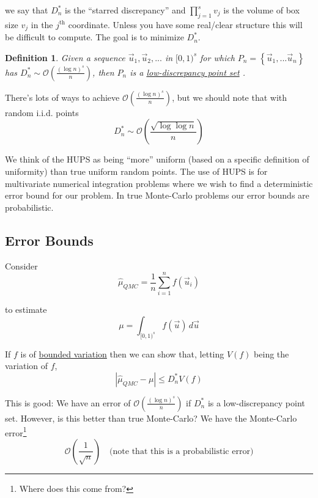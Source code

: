 \documentclass[12pt]{article}
\newtheorem{definition}{Definition}
\newlength\tindent
\renewcommand{\indent}{\hspace*{\tindent}}
\begin{document}
we say that $D_n^*$ is the ``starred discrepancy'' and $\prod^s_{j = 1} v_j$ is the volume of box size $v_j$ in the $j^{\text{th}}$ coordinate. Unless you have some real/clear structure this will be difficult to compute. The goal is to minimize $D_n^*$.

\begin{definition} Given a sequence $\vec{u}_1, \vec{u}_2, ...$ in $[0, 1)^s$ for which $P_n = \left\{ \vec{u}_1, ... \vec{u}_n \right\}$ has $D^*_n \sim \mathcal O \left( \frac{ (\log n)^s }{n} \right)$, then $P_n$ is a \underline{low-discrepancy point set} .
\end{definition}

There's lots of ways to achieve $ \mathcal O \left( \frac{ (\log n)^s }{n} \right)$, but we should note that with random i.i.d. points
\begin{equation*}
	D^*_n \sim \mathcal O \left( \frac{ \sqrt{ \log \log n } }{ n } \right)
\end{equation*}

\indent We think of the HUPS as being ``more'' uniform (based on a specific definition of uniformity) than true uniform random points. The use of HUPS is for multivariate numerical integration problems where we wish to find a deterministic error bound for our problem. In true Monte-Carlo problems our error bounds are probabilistic.

\subsection{Error Bounds}

Consider
\begin{equation*}
	\hat{\mu}_{QMC} = \frac{1}{n} \sum^n_{i = 1} f(\vec{u}_i)
\end{equation*}

to estimate
\begin{equation*}
	\mu = \int_{[0, 1)^s} f(\vec{u}) \,d\vec{u}
\end{equation*}

If $f$ is of \underline{bounded variation} then we can show that, letting $V(f)$ being the variation of $f$,
\begin{equation*}
	\left| \hat{\mu}_{QMC} - \mu \right| \leq D^*_n V(f)
\end{equation*}

\indent This is good: We have an error of $\mathcal O \left( \frac{ (\log n)^s }{n} \right)$ if $D^*_n$ is a low-discrepancy point set. However, is this better than true Monte-Carlo? We have the Monte-Carlo error\footnote{Where does this come from?}
\begin{equation*}
	\mathcal O \left( \frac{1}{\sqrt{n}} \right) \quad \text{(note that this is a probabilistic error)}
\end{equation*}
\end{document}
